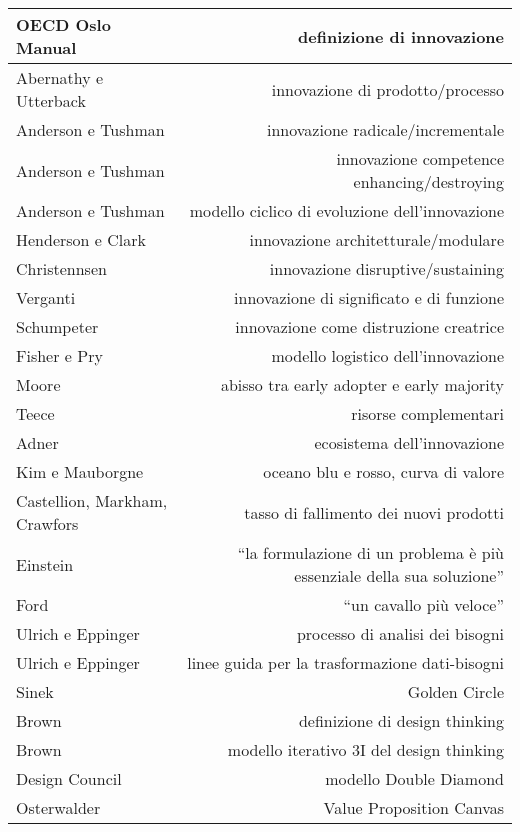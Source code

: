 \documentclass[answers, a4paper, 11pt]{exam}
\begin{document}
\begin{table}[h!]
    \centering
    \begin{tabular}{|l|r|}
    \hline
     OECD Oslo Manual & definizione di innovazione
    \\ \hline Abernathy e Utterback & innovazione di prodotto/processo
    \\ \hline Anderson e Tushman & innovazione radicale/incrementale
    \\ \hline Anderson e Tushman & innovazione competence enhancing/destroying
    \\ \hline Anderson e Tushman & modello ciclico di evoluzione dell'innovazione
    \\ \hline Henderson e Clark & innovazione architetturale/modulare
    \\ \hline Christennsen & innovazione disruptive/sustaining
    \\ \hline Verganti & innovazione di significato e di funzione
    \\ \hline Schumpeter & innovazione come distruzione creatrice
    \\ \hline Fisher e Pry & modello logistico dell'innovazione
    \\ \hline Moore & abisso tra early adopter e early majority
    \\ \hline Teece & risorse complementari
    \\ \hline Adner & ecosistema dell'innovazione
    \\ \hline Kim e Mauborgne & oceano blu e rosso, curva di valore
    \\ \hline Castellion, Markham, Crawfors & tasso di fallimento dei nuovi prodotti
    \\ \hline Einstein & ``la formulazione di un problema è più essenziale della sua soluzione''
    \\ \hline Ford & ``un cavallo più veloce''
    \\ \hline Ulrich e Eppinger & processo di analisi dei bisogni
    \\ \hline Ulrich e Eppinger &linee guida per la trasformazione dati-bisogni
    \\ \hline Sinek & Golden Circle
    \\ \hline Brown & definizione di design thinking
    \\ \hline Brown & modello iterativo 3I del design thinking
    \\ \hline Design Council & modello Double Diamond
    \\ \hline Osterwalder & Value Proposition Canvas

\end{tabular}
\end{table}
\end{document}
